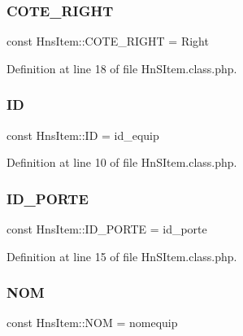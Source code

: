 \subsubsection{\texorpdfstring{C\+O\+T\+E\+\_\+\+R\+I\+G\+HT}{COTE\_RIGHT}}
{\footnotesize\ttfamily const Hns\+Item\+::\+C\+O\+T\+E\+\_\+\+R\+I\+G\+HT = \textquotesingle{}Right\textquotesingle{}}



Definition at line 18 of file Hn\+S\+Item.\+class.\+php.

\mbox{\label{class_hns_item_a2c19b74a90c2806bad8f6cc820c999c2}} 
\subsubsection{\texorpdfstring{ID}{ID}}
{\footnotesize\ttfamily const Hns\+Item\+::\+ID = \textquotesingle{}id\+\_\+equip\textquotesingle{}}



Definition at line 10 of file Hn\+S\+Item.\+class.\+php.

\mbox{\label{class_hns_item_a2a7dbe4b396942203b0b09cbf8d82b52}} 
\subsubsection{\texorpdfstring{I\+D\+\_\+\+P\+O\+R\+TE}{ID\_PORTE}}
{\footnotesize\ttfamily const Hns\+Item\+::\+I\+D\+\_\+\+P\+O\+R\+TE = \textquotesingle{}id\+\_\+porte\textquotesingle{}}



Definition at line 15 of file Hn\+S\+Item.\+class.\+php.

\mbox{\label{class_hns_item_acc250271ab3d01f27a13cd0e0b036a3d}} 
\subsubsection{\texorpdfstring{N\+OM}{NOM}}
{\footnotesize\ttfamily const Hns\+Item\+::\+N\+OM = \textquotesingle{}nomequip\textquotesingle{}}



